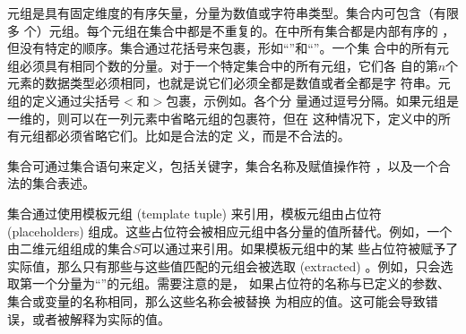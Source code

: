 元组是具有固定维度的有序矢量，分量为数值或字符串类型。集合内可包含（有限多
个）元组。每个元组在集合中都是不重复的。在\zimpl 中所有集合都是内部有序的
，但没有特定的顺序。集合通过花括号来包裹，形如“\code{\{}”和“\code{\}}”。一个集
合中的所有元组必须具有相同个数的分量。对于一个特定集合中的所有元组，它们各
自的第$n$个元素的数据类型必须相同，也就是说它们必须全都是数值或者全都是字
符串。元组的定义通过尖括号$<$和$>$包裹，示例如。各个分
量通过逗号分隔。如果元组是一维的，则可以在一列元素中省略元组的包裹符，但在
这种情况下，定义中的所有元组都必须省略它们。比如是合法的定
义，而是不合法的。

集合可通过集合语句来定义，包括关键字，集合名称及赋值操作符
\code{:=}，以及一个合法的集合表述。

集合通过使用模板元组 (template tuple) 来引用，模板元组由占位符 
(placeholders) 组成。这些占位符会被相应元组中各分量的值所替代。例如，一个
由二维元组组成的集合$S$可以通过来引用。如果模板元组中的某
些占位符被赋予了实际值，那么只有那些与这些值匹配的元组会被选取 (extracted) 
。例如，只会选取第一个分量为“”的元组。需要注意的是，
如果占位符的名称与已定义的参数、集合或变量的名称相同，那么这些名称会被替换
为相应的值。这可能会导致错误，或者被解释为实际的值。

